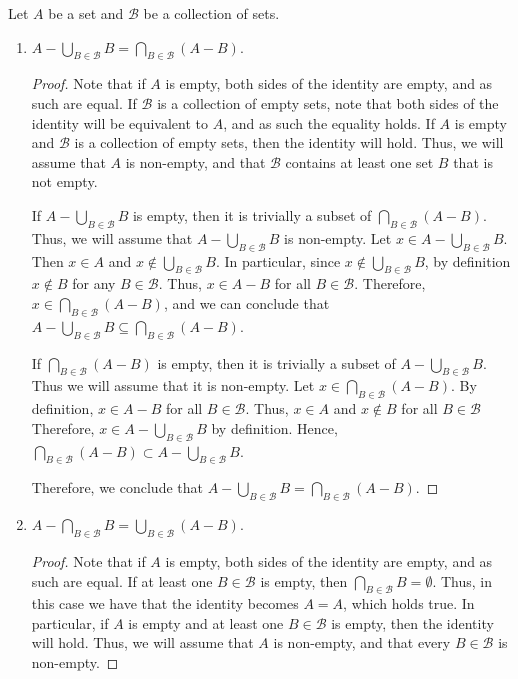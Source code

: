\documentclass[12pt]{article}
\begin{document}
Let $A$ be a set and $\mathcal{B}$ be a collection of sets.
\begin{enumerate}[label=(\alph*)]
	\item $A - \bigcup_{B \in \mathcal{B}} B = \bigcap_{B \in \mathcal{B}} (A - B)$.
	
	\begin{proof}
		Note that if $A$ is empty, both sides of the identity are empty, and as such are 
		equal. If $\mathcal{B}$ is a collection of empty sets, note that both
		sides of the identity will be equivalent to $A$, and as such the equality holds.
		If $A$ is empty and $\mathcal{B}$ is a collection of empty sets, then the identity
		will hold. Thus, we will assume that $A$ is non-empty, and that $\mathcal{B}$ contains
		at least one set $B$ that is not empty.
		
		If $A - \bigcup_{B \in \mathcal{B}} B$ is empty, then it is trivially a subset 
		of $\bigcap_{B \in \mathcal{B}} (A - B)$. Thus, we will assume that
		$A - \bigcup_{B \in \mathcal{B}} B$ is non-empty. Let 
		$x \in A - \bigcup_{B \in \mathcal{B}} B$. Then $x \in A$ and 
		$x \notin \bigcup_{B \in \mathcal{B}} B$. In particular, since 
		$x \notin \bigcup_{B \in \mathcal{B}} B$, by definition $x \notin B$
		for any $B \in \mathcal{B}$. Thus, $x \in A - B$ for all $B \in \mathcal{B}$.
		Therefore, $x \in \bigcap_{B \in \mathcal{B}} (A - B)$, and we can conclude that
		$A - \bigcup_{B \in \mathcal{B}} B \subseteq \bigcap_{B \in \mathcal{B}} (A - B)$.
		
		If $\bigcap_{B \in \mathcal{B}} (A - B)$ is empty,  then it is trivially a subset
		of $A - \bigcup_{B \in \mathcal{B}} B$. Thus we will assume that it is non-empty.
		Let $x \in \bigcap_{B \in \mathcal{B}} (A - B)$. By definition, $x \in A - B$
		for all $B \in \mathcal{B}$. Thus, $x \in A$ and $x \notin B$ for all 
		$B \in \mathcal{B}$ Therefore, $x \in A - \bigcup_{B \in \mathcal{B}} B$
		by definition. Hence, $\bigcap_{B \in \mathcal{B}} (A - B) \subset 
		A - \bigcup_{B \in \mathcal{B}} B$.
		
		Therefore, we conclude that $A - \bigcup_{B \in \mathcal{B}} B = 
		\bigcap_{B \in \mathcal{B}} (A - B)$.
	\end{proof}
	\pagebreak
	\item $A - \bigcap_{B \in \mathcal{B}} B = \bigcup_{B \in \mathcal{B}} (A - B)$.
	
	\begin{proof}
		Note that if $A$ is empty, both sides of the identity are empty, and as such
		are equal. If at least one $B \in \mathcal{B}$ is empty, then 
		$\bigcap_{B \in \mathcal{B}} B = \emptyset$. Thus, in this case we have 
		that the identity becomes $A = A$, which holds true. In particular, if 
		$A$ is empty and at least one $B \in \mathcal{B}$ is empty, then the 
		identity will hold. Thus, we will assume that $A$ is non-empty, and that
		every $B \in \mathcal{B}$ is non-empty.
		

\end{proof}
\end{enumerate}
\end{document}
